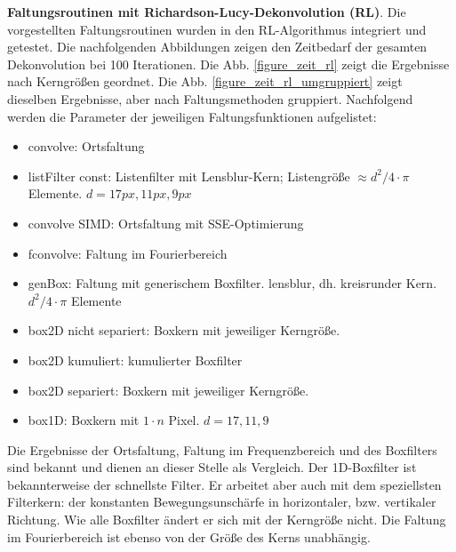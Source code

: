 \documentclass[a4paper,12pt]{article}
\begin{document}
\textbf{Faltungsroutinen mit Richardson-Lucy-Dekonvolution (RL)}.
Die vorgestellten Faltungsroutinen wurden in den RL-Algorithmus integriert und
getestet. Die nachfolgenden Abbildungen zeigen den Zeitbedarf der gesamten
Dekonvolution bei 100 Iterationen. Die Abb. \ref{figure_zeit_rl} zeigt die
Ergebnisse nach Kerngrößen geordnet. Die Abb. \ref{figure_zeit_rl_umgruppiert}
zeigt dieselben Ergebnisse, aber nach Faltungsmethoden gruppiert. Nachfolgend
werden die Parameter der jeweiligen Faltungsfunktionen aufgelistet:
\begin{itemize}
  \itemsep -1pt
  \item convolve: Ortsfaltung
  \item listFilter const: Listenfilter mit Lensblur-Kern; 
  Listengröße $\approx d^{2}/4 \cdot \pi$ Elemente. $d = 17px, 11px, 9px$
  \item convolve SIMD: Ortsfaltung mit SSE-Optimierung
  \item fconvolve: Faltung im Fourierbereich
  \item genBox: Faltung mit generischem Boxfilter. lensblur, dh. kreisrunder
  Kern. $d^{2}/4 \cdot \pi$ Elemente
  \item box2D nicht separiert: Boxkern mit jeweiliger Kerngröße.
  \item box2D kumuliert: kumulierter Boxfilter
  \item box2D separiert: Boxkern mit jeweiliger Kerngröße.
  \item box1D: Boxkern mit $1 \cdot n$ Pixel. $d = 17,11,9$
\end{itemize}

Die Ergebnisse der Ortsfaltung, Faltung im Frequenzbereich und des Boxfilters
sind bekannt und dienen an dieser Stelle als Vergleich. Der 1D-Boxfilter ist
bekannterweise der schnellste Filter. Er arbeitet aber auch mit dem speziellsten
Filterkern: der konstanten Bewegungsunschärfe in horizontaler, bzw. vertikaler
Richtung. Wie alle Boxfilter ändert er sich mit der Kerngröße nicht.
Die Faltung im Fourierbereich ist ebenso von der Größe des Kerns unabhängig.
\end{document}
